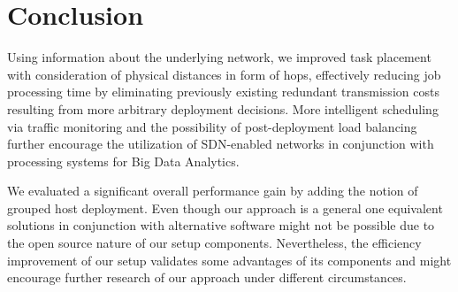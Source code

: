 \section{Conclusion}
Using information about the underlying network, we improved task placement with consideration of
physical distances in form of hops, effectively reducing job processing time by eliminating
previously existing redundant transmission costs resulting from more arbitrary deployment decisions.
More intelligent scheduling via traffic monitoring and the possibility of post-deployment load
balancing further encourage the utilization of SDN-enabled networks in conjunction with processing
systems for Big Data Analytics.

We evaluated a significant overall performance gain by adding the notion of grouped host deployment.
Even though our approach is a general one equivalent solutions in conjunction with alternative
software might not be possible due to the open source nature of our setup components. Nevertheless,
the efficiency improvement of our setup validates some advantages of its components and might
encourage further research of our approach under different circumstances.
